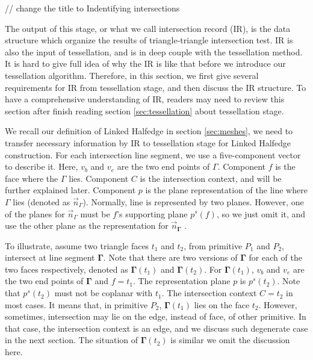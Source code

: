 \documentclass[10pt,journal,compsoc]{IEEEtran}
\begin{document}
// change the title to Indentifying intersections

The output of this stage, or what we call intersection record (IR), is the data structure which organize the results of triangle-triangle intersection test. IR is also the input of tessellation, and is in deep couple with the tessellation method. It is hard to give full idea of why the IR is like that before we introduce our tessellation algorithm. Therefore, in this section, we first give several requirements for IR from tessellation stage, and then discuss the IR structure. To have a comprehensive understanding of IR, readers may need to review this section after finish reading section \ref{sec:tessellation} about tessellation stage.

We recall our definition of Linked Halfedge in section \ref{sec:meshes}, we need to transfer necessary information by IR to tessellation stage for Linked Halfedge construction. For each intersection line segment, we use a five-component vector {} to describe it. Here, $v_b$ and $v_e$ are the two end points of $\Gamma$. Component $f$ is the face where the $\Gamma$ lies. Component $C$ is the intersection context, and will be further explained later. Component $p$ is the plane representation of the line where $\Gamma$ lies (denoted as $\vec{n}_\Gamma$). Normally, line is represented by two planes. However, one of the planes for $\vec{n}_\Gamma$ must be $f$'s supporting plane $p^s(f)$, so we just omit it, and use the other plane as the representation for $\vec{n}_{\boldsymbol{\Gamma}}$ .

To illustrate, assume two triangle faces $t_1$ and $t_2$, from primitive $P_1$ and $P_2$, intersect at line segment ${\boldsymbol{\Gamma}}$. Note that there are two versions of ${\boldsymbol{\Gamma}}$ for each of the two faces respectively, denoted as ${\boldsymbol{\Gamma}}(t_1)$ and ${\boldsymbol{\Gamma}}(t_2)$. For ${\boldsymbol{\Gamma}}(t_1)$, $v_b$ and $v_e$ are the two end points of ${\boldsymbol{\Gamma}}$ and $f=t_1$. The representation plane $p$ is $p^s(t_2)$. Note that $p^s(t_2)$ must not be coplanar with $t_1$. The intersection context $C=t_2$ in most cases. It means that, in primitive $P_2$, ${\boldsymbol{\Gamma}}(t_1)$ lies on the face $t_2$. However, sometimes, intersection may lie on the edge, instead of face,  of other primitive. In that case,  the intersection context is an edge, and we discuss such degenerate case in the next section. The situation of ${\boldsymbol{\Gamma}}(t_2)$ is similar we omit the discussion here.
\end{document}
